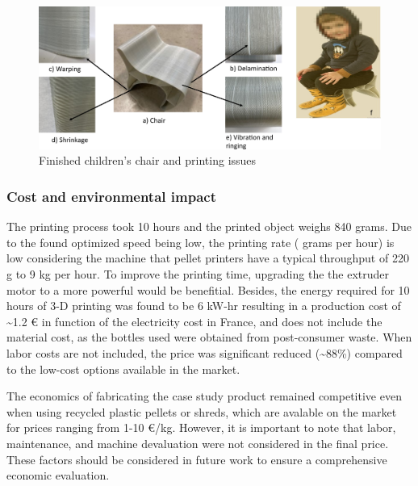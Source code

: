 \documentclass[
  letterpaper,
  DIV=11,
  numbers=noendperiod]{scrartcl}
\begin{document}
\begin{figure}

{\centering \includegraphics{figures/Figure6.png}

}

\caption{\label{fig-child}Finished children's chair and printing issues}

\end{figure}

\hypertarget{cost-and-environmental-impact}{%
\subsubsection{Cost and environmental
impact}\label{cost-and-environmental-impact}}

The printing process took 10 hours and the printed object weighs 840
grams. Due to the found optimized speed being low, the printing rate (
grams per hour) is low considering the machine that pellet printers have
a typical throughput of 220 g to 9 kg per hour. To improve the printing
time, upgrading the the extruder motor to a more powerful would be
benefitial. Besides, the energy required for 10 hours of 3-D printing
was found to be 6 kW-hr resulting in a production cost of
\textasciitilde1.2 € in function of the electricity cost in France, and
does not include the material cost, as the bottles used were obtained
from post-consumer waste. When labor costs are not included, the price
was significant reduced (\textasciitilde88\%) compared to the low-cost
options available in the market.

The economics of fabricating the case study product remained competitive
even when using recycled plastic pellets or shreds, which are avalable
on the market for prices ranging from 1-10 €/kg. However, it is
important to note that labor, maintenance, and machine devaluation were
not considered in the final price. These factors should be considered in
future work to ensure a comprehensive economic evaluation.
\end{document}
